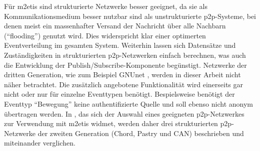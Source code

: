 Für \ac{m2etis} sind strukturierte Netzwerke besser geeignet, da sie als Kommunikationsmedium besser nutzbar sind als unstrukturierte p2p-Systeme, bei denen meist ein massenhafter Versand der Nachricht über alle Nachbarn (\enquote{flooding}) genutzt wird. Dies widerspricht klar einer optimerten Eventverteilung im gesamten System. Weiterhin lassen sich Datensätze und Zuständigkeiten in strukturierten p2p-Netzwerken einfach berechnen, was auch die Entwicklung der Publish/Subscribe-Komponente begünstigt. Netzwerke der dritten Generation, wie zum Beispiel GNUnet \cite{Bennett2002GNet}, werden in dieser Arbeit nicht näher betrachtet. Die zusätzlich angebotene Funktionalität wird einerseits gar nicht oder nur für einzelne Eventtypen benötigt. Bespielsweise benötigt der Eventtyp \enquote{Bewegung} keine authentifizierte Quelle und soll ebenso nicht anonym übertragen werden. In , das sich der Auswahl eines geeigneten p2p-Netzwerkes zur Verwendung mit \ac{m2etis} widmet, werden daher drei strukturierten \ac{p2p}-Netzwerke der zweiten Generation (Chord, Pastry und CAN) beschrieben und miteinander verglichen.


